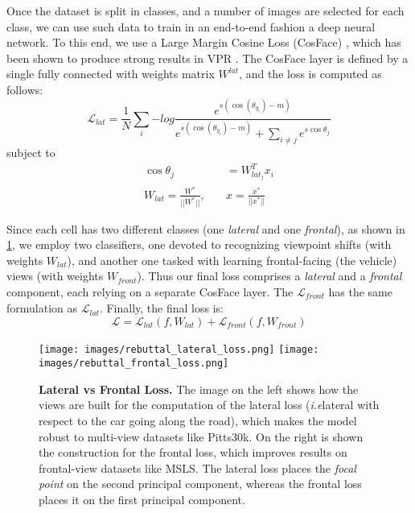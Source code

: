 \documentclass[10pt,twocolumn,letterpaper]{article}
\def\ie{\emph{i.e}\onedot}
\begin{document}
Once the dataset is split in classes, and a number of images are selected for each class, we can use such data to train in an end-to-end fashion a deep neural network.
To this end, we use a Large Margin Cosine Loss (CosFace) \cite{Wang_2018_cosFace}, which has been shown to produce strong results in VPR \cite{Berton_2022_cosPlace}.
The CosFace layer is defined by a single fully connected with weights matrix $W^{lat}$, and the loss is computed as follows:
\begin{equation}
    \mathcal{L}_\textit{lat} = 
    \frac{1}{N} \sum_{i}{- log \frac{e^{s(\cos(\theta_{y_i}) - m)} }
         {e^{s(\cos(\theta_{y_i}) - m)} + \sum_{i \neq j}{e^{s\cos \theta_j}}}
    }
\end{equation}
subject to 
\begin{equation}
\begin{aligned}
    \cos \theta_j &= W_{lat_j}^T x_i \\
    W_{lat} = \frac{W^*}{||W^*||}, \quad &x = \frac{x^*}{||x^*||}
\end{aligned}
\end{equation} 


Since each cell has two different classes (one \textit{lateral} and one \textit{frontal}), as shown in \cref{fig:frontal_lateral_loss}, we employ two classifiers, one devoted to recognizing viewpoint shifts (with weights $W_{lat}$), and another one tasked with learning frontal-facing (\wrt the vehicle) views (with weights $W_{front}$).
Thus our final loss comprises a \textit{lateral} and a \textit{frontal} component, each relying on a separate CosFace layer. The $\mathcal{L}_\textit{front}$ has the same formulation as $\mathcal{L}_\textit{lat}$. 
Finally, the final loss is:
\begin{equation}
\mathcal{L} = \mathcal{L}_\textit{lat}(f, W_{lat}) + \mathcal{L}_\textit{front}(f, W_{front})
\end{equation}


\begin{figure}
    \begin{center}
    \texttt{[image: images/rebuttal\_lateral\_loss.png]}
    \texttt{[image: images/rebuttal\_frontal\_loss.png]}
    \end{center}
    \caption{
    \textbf{Lateral vs Frontal Loss.} The image on the left shows how the views are built for the computation of the lateral loss (\ie lateral with respect to the car going along the road), which makes the model robust to multi-view datasets like Pitts30k. On the right is shown the construction for the frontal loss, which improves results on frontal-view datasets like MSLS.
    The lateral loss places the \emph{focal point} on the second principal component, whereas the frontal loss places it on the first principal component.
    }
    \label{fig:frontal_lateral_loss}
\end{figure}
  
\end{document}

